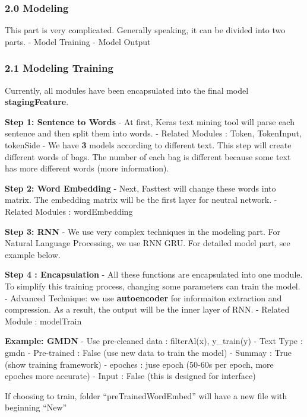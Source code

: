 \documentclass[11pt]{article}
\begin{document}
    \hypertarget{modeling}{%
\subsubsection{2.0 Modeling}\label{modeling}}

    This part is very complicated. Generally speaking, it can be divided
into two parts. - Model Training - Model Output

    \hypertarget{modeling-training}{%
\subsubsection{2.1 Modeling Training}\label{modeling-training}}

    Currently, all modules have been encapsulated into the final model
\textbf{stagingFeature}.

\textbf{Step 1: Sentence to Words} - At first, Keras text mining tool
will parse each sentence and then split them into words. - Related
Modules : Token, TokenInput, tokenSide - We have \textbf{3} models
according to different text. This step will create different words of
bags. The number of each bag is different because some text has more
different words (more information).

\textbf{Step 2: Word Embedding} - Next, Fasttest will change these words
into matrix. The embedding matrix will be the first layer for neutral
network. - Related Modules : wordEmbedding

\textbf{Step 3: RNN} - We use very complex techniques in the modeling
part. For Natural Language Processing, we use RNN GRU. For detailed
model part, see example below.

\textbf{Step 4 : Encapsulation} - All these functions are encapsulated
into one module. To simplify this training process, changing some
parameters can train the model. - Advanced Technique: we use
\textbf{autoencoder} for informaiton extraction and compression. As a
result, the output will be the inner layer of RNN. - Related Module :
modelTrain

    \textbf{Example: GMDN} - Use pre-cleaned data : filterAl(x), y\_train(y)
- Text Type : gmdn - Pre-trained : False (use new data to train the
model) - Summay : True (show training framework) - epoches : juse epoch
(50-60s per epoch, more epoches more accurate) - Input : False (this is
designed for interface)

If choosing to train, folder ``preTrainedWordEmbed'' will have a new
file with beginning ``New''
\end{document}
